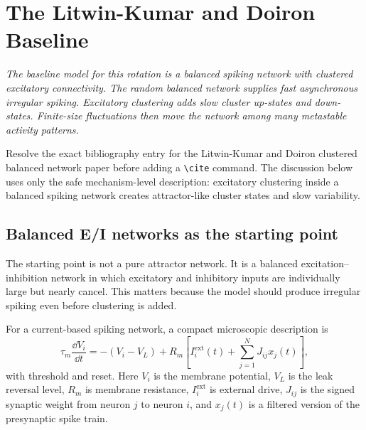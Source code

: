 \chapter{The Litwin-Kumar and Doiron Baseline}
\label{ch:litwin-kumar-doiron-baseline}

\textit{The baseline model for this rotation is a balanced spiking network with clustered excitatory connectivity. The random balanced network supplies fast asynchronous irregular spiking. Excitatory clustering adds slow cluster up-states and down-states. Finite-size fluctuations then move the network among many metastable activity patterns.}

\begin{aside}
Resolve the exact bibliography entry for the Litwin-Kumar and Doiron clustered balanced network paper before adding a \texttt{\textbackslash cite} command. The discussion below uses only the safe mechanism-level description: excitatory clustering inside a balanced spiking network creates attractor-like cluster states and slow variability.
\end{aside}

\section{Balanced E/I networks as the starting point}
\label{sec:balanced-ei-networks-starting-point}

The starting point is not a pure attractor network. It is a balanced excitation--inhibition network in which excitatory and inhibitory inputs are individually large but nearly cancel. This matters because the model should produce irregular spiking even before clustering is added.

For a current-based spiking network, a compact microscopic description is
%
\begin{equation}
  \tau_m \frac{\dd V_i}{\dd t}
  =
  -(V_i-V_L)
  +
  R_m\left[
    I_i^{\mathrm{ext}}(t)
    +
    \sum_{j=1}^N J_{ij}x_j(t)
  \right],
  \label{eq:lkd-membrane-current}
\end{equation}
%
with threshold and reset. Here $V_i$ is the membrane potential, $V_L$ is the leak reversal level, $R_m$ is membrane resistance, $I_i^{\mathrm{ext}}$ is external drive, $J_{ij}$ is the signed synaptic weight from neuron $j$ to neuron $i$, and $x_j(t)$ is a filtered version of the presynaptic spike train.

